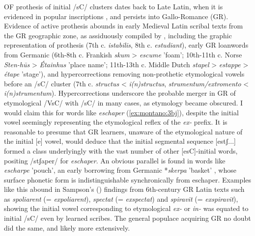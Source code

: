 \documentclass[output=paper,colorlinks,citecolor=brown,
]{langscibook}
\begin{document}
OF prothesis of initial /sC/ clusters dates back to Late Latin, when it is evidenced in popular inscriptions \citep{Pope1952, Rohlfs1970, Sampson2003}, and persists into Gallo-Romance (GR).  Evidence of active prothesis abounds in early Medieval Latin scribal texts from the GR geographic zone, as assiduously compiled by \citet{Sampson2010}, including the graphic representation of prothesis (7th c. \textit{istabilis}, 8th c. \textit{estudiant}),  early GR loanwords from Germanic (6th-8th c. Frankish \textit{skum} > \textit{escume} 'foam'; 10th-11th c. Norse \textit{Sten-hūs} > \textit{Étainhus} 'place name'; 11th-13th c. Middle Dutch \textit{stapel} > \textit{estappe} > \textit{étape} 'stage'), and hypercorrections removing non-prothetic etymological vowels before an /sC/ cluster (7th c. \textit{structus} < \textit{i(n)structus}, \textit{strumentum/extromento} < \textit{i(n)strumentum}).  Hypercorrections underscore the probable merger in GR of etymological /VsC/ with /sC/ in many cases, as etymology became obscured.  I would claim this for words like \textit{eschaper} (\ref{ex:montano:3bj}), despite the initial vowel seemingly representing the etymological reflex of the \textit{ex-} prefix.  It is reasonable to presume that GR learners, unaware of the etymological nature of the initial [e] vowel, would deduce that the initial segmental sequence [estʃ...] formed a class underlyingly with the vast number of other [esC]-initial words, positing /stʃaper/ for \textit{eschaper}.  An obvious parallel is found in words like \textit{escharpe} 'pouch', an early borrowing from Germanic *\textit{skerpa} 'basket' \citep{Pope1952}, whose surface phonetic form is indistinguishable synchronically from eschaper.  Examples like this abound in Sampson's (\citeyear{Sampson2010}) findings from 6th-century GR Latin texts such as \textit{spoliarent} (= \textit{expoliarent}), \textit{spectat} (= \textit{exspectat}) and \textit{spiravit} (= \textit{exspiravit}), showing the initial vowel corresponding to etymological \textit{ex-} or \textit{in-} was equated to initial /sC/ even by learned scribes.  The general populace acquiring GR no doubt did the same, and likely more extensively.
\end{document}
